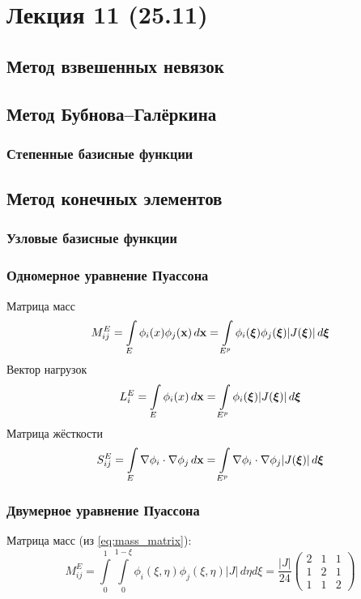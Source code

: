 \section{Лекция 11 (25.11)}
\subsection{Метод взвешенных невязок}
\subsection{Метод Бубнова--Галёркина}
\subsubsection{Степенные базисные функции}
\subsection{Метод конечных элементов}
\subsubsection{Узловые базисные функции}
\subsubsection{Одномерное уравнение Пуассона}
Матрица масс
\begin{equation}
\label{eq:mass_matrix}
M^E_{ij} = \arint{\phi_i(x) \phi_j(\vec x)}{E}{\vec x} = \arint{\phi_i(\vec \xi) \phi_j(\vec \xi) |J(\vec \xi)|}{E^p}{\vec \xi}
\end{equation}
Вектор нагрузок
\begin{equation}
\label{eq:load_vector}
L^E_{i} = \arint{\phi_i(x)}{E}{\vec x} = \arint{\phi_i(\vec \xi) |J(\vec \xi)|}{E^p}{\vec \xi}
\end{equation}
Матрица жёсткости
\begin{equation}
\label{eq:stiff_matrix}
S^E_{ij} = \arint{\nabla \phi_i \cdot \nabla \phi_j}{E}{\vec x} = \arint{\nabla \phi_i \cdot \nabla \phi_j |J(\vec \xi)|}{E^p}{\vec \xi}
\end{equation}
\subsubsection{Двумерное уравнение Пуассона}
Матрица масс (из \cref{eq:mass_matrix}):
\begin{equation}
\label{eq:mass_matrix_lintri}
M^E_{ij} = \int\limits_0^1 \int\limits_0^{1-\xi} \phi_i(\xi, \eta) \phi_j(\xi, \eta) |J| \, d\eta d\xi =
\frac{|J|}{24}\left(
\begin{array}{ccc}
2 & 1 & 1 \\
1 & 2 & 1 \\
1 & 1 & 2
\end{array}
\right)
\end{equation}

